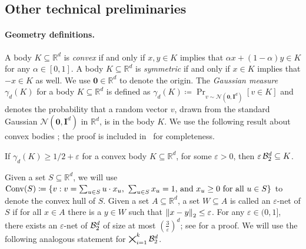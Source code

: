

\subsection{Other technical preliminaries}

\paragraph{Geometry definitions.} 


A body $K \subseteq \mathbb{R}^d$ is \emph{convex} if and only if $x, y \in K$ implies that $\alpha x + (1-\alpha) y \in K$ for any $\alpha \in [0,1]$. A body $K\subseteq \mathbb{R}^d$ is \emph{symmetric} if and only if $x \in K$ implies that $-x \in K$ as well. We use $\mathbf{0} \in \mathbb{R}^d$ to denote the origin. The \emph{Gaussian measure} $\gamma_d(K)$ for a body $K \subseteq \mathbb{R}^d$ is defined as $\gamma_d(K) \coloneqq \Pr_{v \sim \mathcal{N}(\mathbf{0}, \mathbf{I}^d)}[v \in K]$ and denotes the probability that a random vector $v$, drawn from the standard Gaussian $\mathcal{N}(\mathbf{0}, \mathbf{I}^d)$ in $\mathbb{R}^d$, is in the body $K$.  We use the following result about convex bodies \cite{ball1997elementary}; the proof is included in~ for completeness.

\begin{proposition}\label{proposition:large-body-ball}
    If $\gamma_d(K) \geq 1/2 + \varepsilon$ for a convex body $K \subseteq \mathbb{R}^d$, for some $\varepsilon > 0$, then $\varepsilon \, \mathcal{B}^d_2 \subseteq K$.
\end{proposition}

Given a set $S \subseteq \mathbb{R}^d$, we will use $\mathrm{Conv}(S) \coloneqq \{v : v = \sum_{u \in S} u \cdot x_u \text{, } \sum_{u \in S} x_u = 1 \text{, and } x_u \geq 0 \text{ for all } u \in S\}$ to denote the convex hull of $S$. Given a set $A \subseteq \mathbb{R}^d$, a set $W \subseteq A$ is called an $\varepsilon$-net of $S$ if for all $x \in A$ there is a $y \in W$ such that $\left\lVert x - y\right\rVert_2 \leq \varepsilon$. For any $\varepsilon \in (0,1]$, there exists an $\varepsilon$-net of $\mathcal{B}^d_2$ of size at most $\left( \frac{3}{\varepsilon} \right)^{d}$; see \cite{kulkarni2024optimal} for a proof. We will use the following analogous statement for $\bigtimes_{i=1}^k \mathcal{B}^d_2$.

